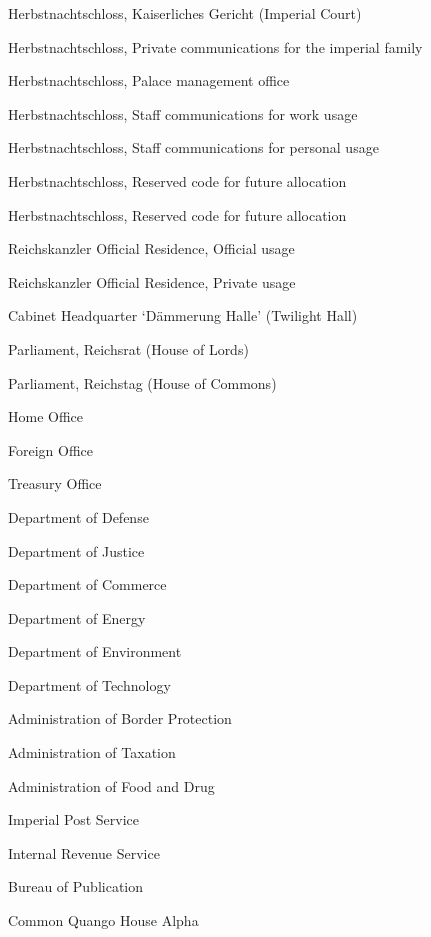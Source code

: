 \documentclass[a4paper,11pt]{report}
\begin{document}
\begin{compactenum}
    \item Herbstnachtschloss, Kaiserliches Gericht (Imperial Court)
    \item Herbstnachtschloss, Private communications for the imperial family
    \item Herbstnachtschloss, Palace management office
    \item Herbstnachtschloss, Staff communications for work usage
    \item Herbstnachtschloss, Staff communications for personal usage
    \item Herbstnachtschloss, Reserved code for future allocation
    \item Herbstnachtschloss, Reserved code for future allocation
    \item Reichskanzler Official Residence, Official usage
    \item Reichskanzler Official Residence, Private usage
    \item Cabinet Headquarter `Dämmerung Halle' (Twilight Hall)
    \item Parliament, Reichsrat (House of Lords)
    \item Parliament, Reichstag (House of Commons)
    \item Home Office
    \item Foreign Office
    \item Treasury Office
    \item Department of Defense
    \item Department of Justice
    \item Department of Commerce
    \item Department of Energy
    \item Department of Environment
    \item Department of Technology
    \item Administration of Border Protection
    \item Administration of Taxation
    \item Administration of Food and Drug
    \item Imperial Post Service
    \item Internal Revenue Service
    \item Bureau of Publication
    \item Common Quango House Alpha
\end{compactenum}
\end{document}
